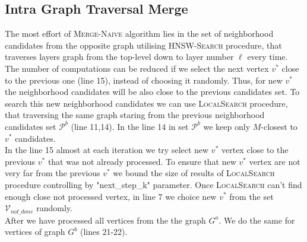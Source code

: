 \documentclass{article}
\begin{document}
\subsection{Intra Graph Traversal Merge}
The most effort of \textsc{Merge-Naive} algorithm lies in the set of neighborhood candidates from the opposite graph utilising \textsc{HNSW-Search} procedure, that traverses layers graph from the top-level down to layer number $\ell$ every time. The number of computations can be reduced if we select the next vertex $v^*$ close to the previous one (line 15), instead of choosing it randomly. Thus, for new $v^*$ the neighborhood candidates will be  also close to the previous candidates set. To search this new neighborhood candidates we can use \textsc{LocalSearch} procedure, that traversing the same graph staring from the previous neighborhood candidates set $\mathcal{P}^b$ (line 11,14). In the line 14 in set $\mathcal{P}^b$ we keep only $M$-closest to $v^*$ candidates.\\
In the line 15 almost at each iteration we try select new $v^*$ vertex close to the previous  $v^*$ that was not already processed.  
To ensure that new $v^*$ vertex are not very far from the previous $v^*$ we bound the size of results of \textsc{LocalSearch} procedure controlling by "next\_step\_k" parameter. Once \textsc{LocalSearch} can't find enough close not processed vertex, in line 7 we choice new $v^*$ from the set $\mathcal{V}_{not\_done}$ randomly. \\
After we have processed all vertices from the the graph $G^a$. We do the same for vertices of graph $G^b$ (lines 21-22).  
\end{document}

